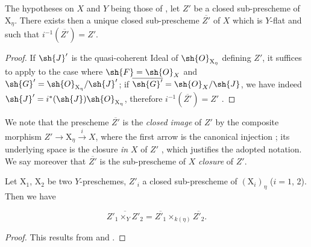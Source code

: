 \begin{proposition}[2.8.5]
\label{IV.2.8.5}
The hypotheses on $X$ and $Y$ being those of , let $Z'$ be a
closed sub-prescheme of $\mathrm{X}_\eta$. There exists then a unique closed sub-prescheme $\overline{Z'}$ of $X$ which is $Y$-flat
and such that $i^{-1}(\overline{Z'})=Z'$.
\end{proposition}

\begin{proof}
If $\sh{J}'$ is the quasi-coherent Ideal of $\sh{O}_{\mathrm{X}_\eta}$ defining $Z'$, it suffices to apply 
to the case where $\sh{F}=\sh{O}_X$ and $\sh{G}'=\sh{O}_{\mathrm{X}_\eta}/\sh{J}'$; if $\overline{\sh{G}'}=\sh{O}_X/\sh{J}$, we have indeed $\sh{J}'=i^*(\sh{J})\sh{O}_{\mathrm{X}_\eta}$, therefore
$i^{-1}(\overline{Z'})=Z'$ .
\end{proof}

We note that the prescheme $\overline{Z'}$ is the \emph{closed image} of $Z'$ by the composite morphism
$Z'\to\mathrm{X}_\eta\xrightarrow{i} X$, where the first arrow is the canonical injection ; its underlying
space is the closure \emph{in} $X$ of $Z'$ , which justifies the adopted notation.
We say moreover that $\overline{Z'}$ is the sub-prescheme of $X$ \emph{closure} of $Z'$.

\begin{corollary}[2.8.6]
\label{IV.2.8.6}
Let $\mathrm{X}_1$, $\mathrm{X}_2$ be two $Y$-preschemes, $Z'_i$ a closed sub-prescheme
of $(\mathrm{X}_i)_\eta$ ($i=1$, 2). Then we have
\end{corollary}

\begin{env}[2.8.6.1]
\label{IV.2.8.6.1}
\[
  \overline{Z'_1\times_Y Z'_2} = \overline{Z'_1}\times_{k(\eta)}\overline{Z'_2}.
\]
\end{env}

\begin{proof}
This results from  and .
\end{proof}
